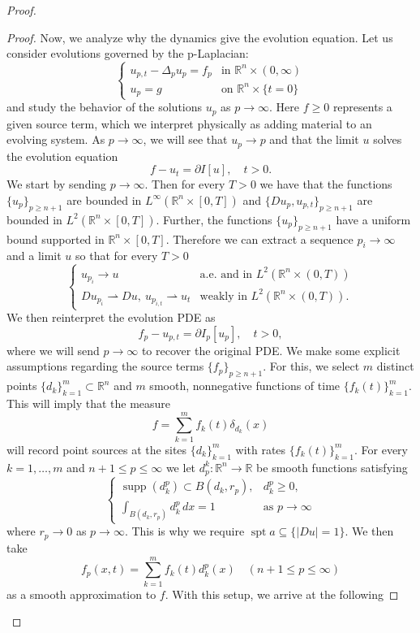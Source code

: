 \documentclass{article}
\begin{document}
\begin{flushleft}
\begin{proof}
\begin{proof}
Now, we analyze why the dynamics give the evolution equation. Let us consider evolutions governed by the p-Laplacian:
$$\begin{cases} 
      u_{p,t} - \Delta_p u_p = f_p & \text{in $\mathbb R^n \times (0,\infty)$}\\
      u_p = g & \text{on $\mathbb R^n \times \{t=0\}$}
   \end{cases}$$
and study the behavior of the solutions $u_p$ as $p\to\infty$. Here $f\geq 0$ represents
a given source term, which we interpret physically as adding material to an
evolving system. As $p\to\infty$, we will see that $u_p\to p$ and that the limit $u$ solves the evolution equation
$$f-u_t = \partial I[u], \quad t>0.$$
We start by sending $p\to\infty$. Then for every $T>0$ we have that the functions $\{u_p\}_{p\geq n+1}$ are bounded in $L^{\infty}(\mathbb R^n \times [0,T])$ and $\{Du_p,u_{p,t}\}_{p\geq n+1}$ are bounded in $L^2(\mathbb R^n \times [0,T])$.
Further, the functions $\{u_p\}_{p\geq n+1}$ have a uniform bound supported in $\mathbb R^n \times [0,T]$. Therefore we can extract a sequence $p_i \to \infty$ and a limit $u$ so that for every $T>0$
\begin{equation}
  \begin{cases} 
      u_{p_i} \to u & \text{a.e. and in $L^2\left(\mathbb R^n \times (0,T)\right)$}\\
      Du_{p_i} \rightharpoonup Du, ~ u_{p_{i,t}} \rightharpoonup u_t & \text{weakly in $L^2\left(\mathbb R^n \times (0,T)\right)$}.
   \end{cases}
\end{equation}
We then reinterpret the evolution PDE as
$$f_p - u_{p,t}=\partial I_p[u_p], \quad t>0, $$
where we will send $p\to\infty$ to recover the original PDE. We make some explicit assumptions regarding the source terms $\{f_p\}_{p\geq n+1}.$ For this, we select $m$ distinct points $\{d_k\}_{k=1}^m \subset \mathbb R^n$ and $m$ smooth, nonnegative functions of time $\{f_k(t)\}_{k=1}^m$. This will imply that the measure
$$f=\sum_{k=1}^m f_k(t)\delta_{d_k}(x)$$
will record point sources at the sites $\{d_k\}_{k=1}^m$ with rates $\{f_k(t)\}_{k=1}^m$. For every $k=1,\ldots,m$ and $n+1\leq p \leq \infty$ we let $d_p^k:\mathbb R^n \to \mathbb R$ be smooth functions satisfying
 $$\begin{cases} 
      \operatorname{supp}(d_k^p)\subset B(d_k,r_p), & d_k^p\geq 0,\\
      \int_{B(d_k,r_p)} d_k^p \,dx =1 & \text{as $p\to\infty$}
   \end{cases}$$
 where $r_p \to 0$ as $p\to\infty$. This is why we require $\operatorname{spt}a \subseteq \{|Du|=1\}.$ We then take
 $$f_p(x,t)=\sum_{k=1}^m f_k(t) d_k^p(x)\quad (n+1\leq p \leq \infty)$$
 as a smooth approximation to $f$. With this setup, we arrive at the following 


\end{proof}
\end{proof}
\end{flushleft}
\end{document}

